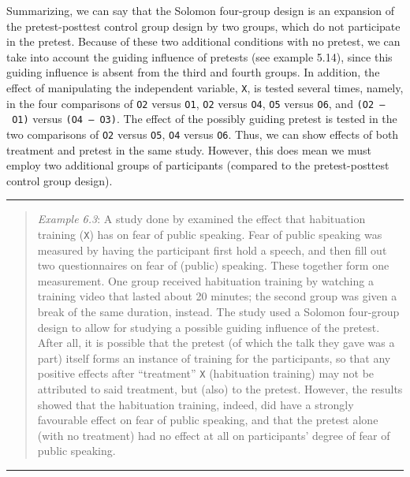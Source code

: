 \documentclass[
]{book}
\begin{document}
Summarizing, we can say that the Solomon four-group design is an expansion of the pretest-posttest control group design by two groups, which do not participate in the pretest. Because of these two additional conditions with no pretest, we can take into account the guiding influence of pretests (see example 5.14), since this guiding influence is absent from the third and fourth groups. In addition, the effect of manipulating the independent variable, \texttt{X}, is tested several times, namely, in the four comparisons of \texttt{O2} versus \texttt{O1}, \texttt{O2} versus \texttt{O4}, \texttt{O5} versus \texttt{O6}, and \texttt{(O2\ –\ O1)} versus \texttt{(O4\ –\ O3)}. The effect of the possibly guiding pretest is tested in the two comparisons of \texttt{O2} versus \texttt{O5}, \texttt{O4} versus \texttt{O6}. Thus, we can show effects of both treatment and pretest in the same study. However, this does mean we must employ two additional groups of participants (compared to the pretest-posttest control group design).

\begin{center}\rule{0.5\linewidth}{0.5pt}\end{center}

\begin{quote}
\emph{Example 6.3}: A study done by \citet{AHW00} examined the effect that habituation training (\texttt{X}) has on fear of public speaking. Fear of public speaking was measured by having the participant first hold a speech, and then fill out two questionnaires on fear of (public) speaking. These together form one measurement. One group received habituation training by watching a training video that lasted about 20 minutes; the second group was given a break of the same duration, instead. The study used a Solomon four-group design to allow for studying a possible guiding influence of the pretest. After all, it is possible that the pretest (of which the talk they gave was a part) itself forms an instance of training for the participants, so that any positive effects after ``treatment'' \texttt{X} (habituation training) may not be attributed to said treatment, but (also) to the pretest. However, the results showed that the habituation training, indeed, did have a strongly favourable effect on fear of public speaking, and that the pretest alone (with no treatment) had no effect at all on participants' degree of fear of public speaking.
\end{quote}

\begin{center}\rule{0.5\linewidth}{0.5pt}\end{center}
\end{document}
